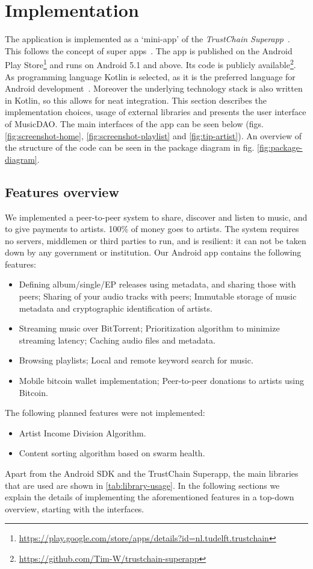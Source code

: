 \chapter{Implementation}
The application is implemented as a `mini-app' of the \textit{TrustChain Superapp}~\citep{mattskala2020}. This follows the concept of super apps~\citep{kpmg2019superapps}. The app is published on the Android Play Store\footnote{\url{https://play.google.com/store/apps/details?id=nl.tudelft.trustchain}} and runs on Android 5.1 and above. Its code is publicly available\footnote{\url{https://github.com/Tim-W/trustchain-superapp}}. As programming language Kotlin is selected, as it is the preferred language for Android development~\citep{googleio2019}. Moreover the underlying technology stack is also written in Kotlin, so this allows for neat integration. This section describes the implementation choices, usage of external libraries and presents the user interface of MusicDAO. The main interfaces of the app can be seen below (figs. \ref{fig:screenshot-home}, \ref{fig:screenshot-playlist} and \ref{fig:tip-artist}). An overview of the structure of the code can be seen in the package diagram in fig. \ref{fig:package-diagram}.

\section{Features overview}
We implemented a peer-to-peer system to share, discover and listen to music, and to give payments to artists. 100\% of money goes to artists. The system requires no servers, middlemen or third parties to run, and is resilient: it can not be taken down by any government or institution. Our Android app contains the following features:
\begin{itemize}
    \item Defining album/single/EP releases using metadata, and sharing those with peers; Sharing of your audio tracks with peers; Immutable storage of music metadata and cryptographic identification of artists.
    \item Streaming music over BitTorrent; Prioritization algorithm to minimize streaming latency; Caching audio files and metadata.
    \item Browsing playlists; Local and remote keyword search for music.
    \item Mobile bitcoin wallet implementation; Peer-to-peer donations to artists using Bitcoin.
\end{itemize}
The following planned features were not implemented:
\begin{itemize}
    \item Artist Income Division Algorithm.
    \item Content sorting algorithm based on swarm health.
\end{itemize}
Apart from the Android SDK and the TrustChain Superapp, the main libraries that are used are shown in \ref{tab:library-usage}. In the following sections we explain the details of implementing the aforementioned features in a top-down overview, starting with the interfaces.

